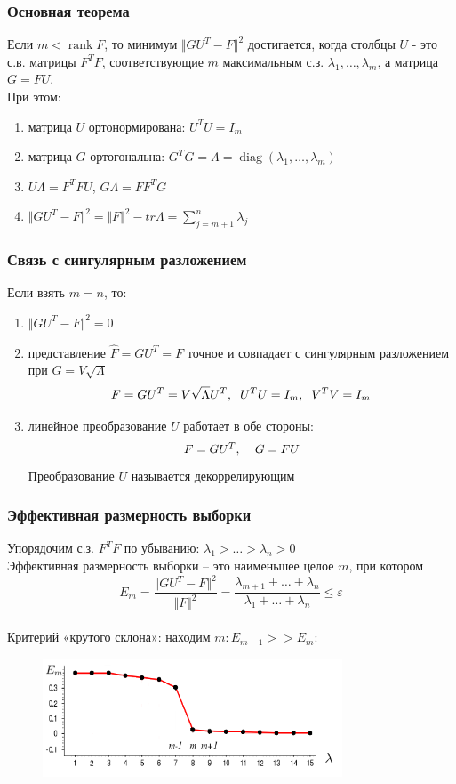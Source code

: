 \documentclass[12pt, aspectratio=169]{beamer}
\DeclareMathOperator{\rank}{rank}
\begin{document}
\begin{frame}\frametitle{Основная теорема}
Если $m < \rank F$, то минимум $\Vert GU^T - F \Vert^2$ достигается, когда столбцы $U$ - это с.в. матрицы $F^TF$, соответствующие $m$ максимальным с.з. $\lambda_1,\dots, \lambda_m$, а матрица $G = FU$.\\
\vspace{5mm}
При этом:\\
\begin{enumerate}[--]
\item матрица $U$ ортонормирована: $U^TU = I_m$
\item матрица $G$ ортогональна: $G^TG = \Lambda = \operatorname{diag}(\lambda_1, \dots, \lambda_m)$
\item $U\Lambda = F^TFU$,  $G\Lambda = FF^TG$
\item $\Vert GU^T - F \Vert^2 = \Vert F \Vert^2 - tr \Lambda = \sum\limits_{j=m+1}^n \lambda_j$
\end{enumerate}

\end{frame}

\begin{frame}\frametitle{Связь с сингулярным разложением}
Если взять $m = n$, то:\\
\begin{enumerate}[--]
\item $\Vert GU^T - F \Vert^2 = 0$
\item представление $\hat{F} = GU^T = F$ точное и совпадает с сингулярным разложением при $G = V \sqrt{\Lambda}$
$$F = GU^T = V\sqrt{\Lambda}U^T, \hspace{2mm} U^TU = I_m, \hspace{2mm} V^TV = I_m$$
\item линейное преобразование $U$ работает в обе стороны:\\
$$F= GU^T, \hspace{4mm} G=FU$$
Преобразование $U$ называется декоррелирующим
\end{enumerate}
\end{frame}

\begin{frame}\frametitle{Эффективная размерность выборки}
Упорядочим с.з. $F^TF$ по убыванию: $\lambda_1 > \dots > \lambda_n > 0$\\
Эффективная размерность выборки -- это наименьшее целое $m$, при котором\\
$$E_m = \frac{\Vert GU^T - F \Vert^2}{\Vert F \Vert^2} = \frac{\lambda_{m+1} + \dots + \lambda_{n}}{\lambda_1 + \dots + \lambda_n} \leq \varepsilon$$\\
Критерий «крутого склона»: находим $m: E_{m-1} >> E_m$:
\begin{figure}[htbp]
  \includegraphics[height=100pt, keepaspectratio = true]{images/edge}   
\end{figure}
\end{frame}
\end{document}
